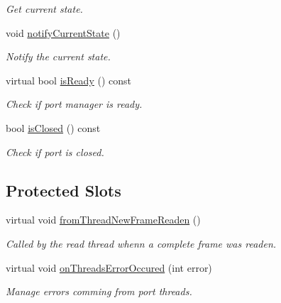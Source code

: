 \begin{DoxyCompactItemize}
\begin{DoxyCompactList}\small\item\em Get current state. \end{DoxyCompactList}\item 
void \hyperlink{classmdt_port_manager_a0c460b47b12e38e708321be79f6343d8}{notifyCurrentState} ()
\begin{DoxyCompactList}\small\item\em Notify the current state. \end{DoxyCompactList}\item 
virtual bool \hyperlink{classmdt_port_manager_a6dc2798324521d177fb8f79d4f6c5f0f}{isReady} () const 
\begin{DoxyCompactList}\small\item\em Check if port manager is ready. \end{DoxyCompactList}\item 
bool \hyperlink{classmdt_port_manager_aeecbec49376838ab3547729636166d97}{isClosed} () const 
\begin{DoxyCompactList}\small\item\em Check if port is closed. \end{DoxyCompactList}\end{DoxyCompactItemize}
\subsection*{Protected Slots}
\begin{DoxyCompactItemize}
\item 
virtual void \hyperlink{classmdt_port_manager_a4fcc8f0699b655156e661bb3de6056cc}{fromThreadNewFrameReaden} ()
\begin{DoxyCompactList}\small\item\em Called by the read thread whenn a complete frame was readen. \end{DoxyCompactList}\item 
virtual void \hyperlink{classmdt_port_manager_a7e45b8e3475e5182ed12218616664d07}{onThreadsErrorOccured} (int error)
\begin{DoxyCompactList}\small\item\em Manage errors comming from port threads. \end{DoxyCompactList}\end{DoxyCompactItemize}
